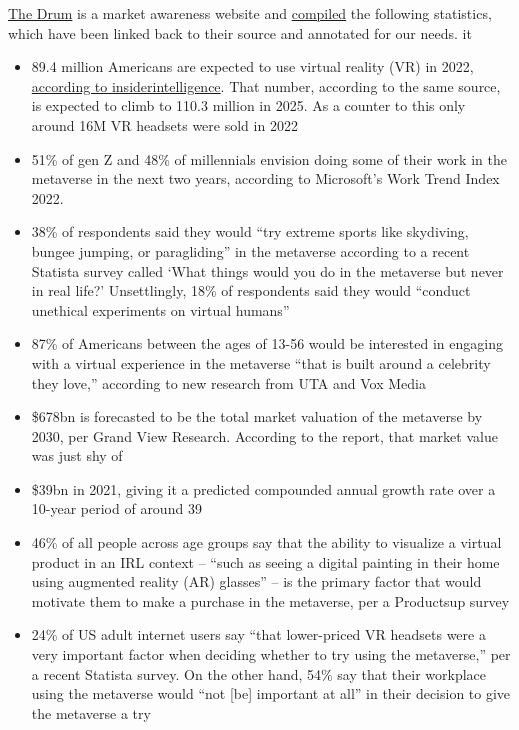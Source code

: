 \href{https://www.thedrum.com/about-us}{The Drum} is a market awareness website and \href{https://www.thedrum.com/news/2022/08/01/web3-the-numbers-key-metaverse-crypto-and-nft-stats-every-marketer-should-know}{compiled} the following statistics, which have been linked back to their source and annotated for our needs. 
it{\begin{itemize}
\item 89.4 million Americans are expected to use virtual reality (VR) in 2022, \href{https://www.insiderintelligence.com/content/us-augmented-virtual-reality-users-forecast-2022}{according to insiderintelligence}. That number, according to the same source, is expected to climb to 110.3 million in 2025. As a counter to this only around 16M VR headsets were sold in 2022
\item 51\% of gen Z and 48\% of millennials envision doing some of their work in the metaverse in the next two years, according to Microsoft’s Work Trend Index 2022.
\item 38\% of respondents said they would “try extreme sports like skydiving, bungee jumping, or paragliding” in the metaverse according to a recent Statista survey called ‘What things would you do in the metaverse but never in real life?’ Unsettlingly, 18\% of respondents said they would “conduct unethical experiments on virtual humans”
\item 87\% of Americans between the ages of 13-56 would be interested in engaging with a virtual experience in the metaverse “that is built around a celebrity they love,” according to new research from UTA and Vox Media
\item \$678bn is forecasted to be the total market valuation of the metaverse by 2030, per Grand View Research. According to the report, that market value was just shy of \item \$39bn in 2021, giving it a predicted compounded annual growth rate over a 10-year period of around 39%
\item 46\% of all people across age groups say that the ability to visualize a virtual product in an IRL context – “such as seeing a digital painting in their home using augmented reality (AR) glasses” – is the primary factor that would motivate them to make a purchase in the metaverse, per a Productsup survey
\item 24\% of US adult internet users say “that lower-priced VR headsets were a very important factor when deciding whether to try using the metaverse,” per a recent Statista survey. On the other hand, 54\% say that their workplace using the metaverse would “not [be] important at all” in their decision to give the metaverse a try

\end{itemize}}
